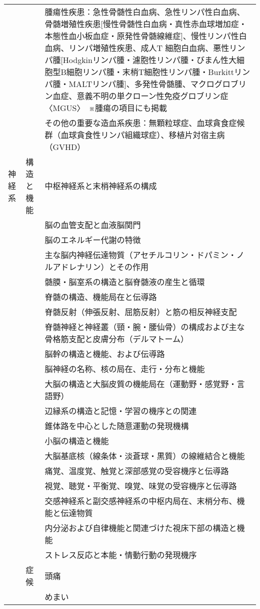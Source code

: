 \begin{xltabular}{\linewidth}{XXX}
 &  & 腫瘍性疾患：急性骨髄性白血病、急性リンパ性白血病、骨髄増殖性疾患[慢性骨髄性白血病・真性赤血球増加症・本態性血小板血症・原発性骨髄線維症]、慢性リンパ性白血病、リンパ増殖性疾患、成人T 細胞白血病、悪性リンパ腫[Hodgkinリンパ腫・濾胞性リンパ腫・びまん性大細胞型B細胞リンパ腫・末梢T細胞性リンパ腫・Burkittリンパ腫・MALTリンパ腫]、多発性骨髄腫、マクログロブリン血症、意義不明の単クローン性免疫グロブリン症〈MGUS〉　※腫瘍の項目にも掲載 \\
 &  & その他の重要な造血系疾患：無顆粒球症、血球貪食症候群（血球貪食性リンパ組織球症）、移植片対宿主病（GVHD） \\
神経系 & 構造と機能 & 中枢神経系と末梢神経系の構成 \\
 &  & 脳の血管支配と血液脳関門 \\
 &  & 脳のエネルギー代謝の特徴 \\
 &  & 主な脳内神経伝達物質（アセチルコリン・ドパミン・ノルアドレナリン）とその作用 \\
 &  & 髄膜・脳室系の構造と脳脊髄液の産生と循環 \\
 &  & 脊髄の構造、機能局在と伝導路 \\
 &  & 脊髄反射（伸張反射、屈筋反射）と筋の相反神経支配 \\
 &  & 脊髄神経と神経叢（頸・腕・腰仙骨）の構成および主な骨格筋支配と皮膚分布（デルマトーム） \\
 &  & 脳幹の構造と機能、および伝導路 \\
 &  & 脳神経の名称、核の局在、走行・分布と機能 \\
 &  & 大脳の構造と大脳皮質の機能局在（運動野・感覚野・言語野） \\
 &  & 辺縁系の構造と記憶・学習の機序との関連 \\
 &  & 錐体路を中心とした随意運動の発現機構 \\
 &  & 小脳の構造と機能 \\
 &  & 大脳基底核（線条体・淡蒼球・黒質）の線維結合と機能 \\
 &  & 痛覚、温度覚、触覚と深部感覚の受容機序と伝導路 \\
 &  & 視覚、聴覚・平衡覚、嗅覚、味覚の受容機序と伝導路 \\
 &  & 交感神経系と副交感神経系の中枢内局在、末梢分布、機能と伝達物質 \\
 &  & 内分泌および自律機能と関連づけた視床下部の構造と機能 \\
 &  & ストレス反応と本能・情動行動の発現機序 \\
 & 症候 & 頭痛 \\
 &  & めまい \\

\end{xltabular}
